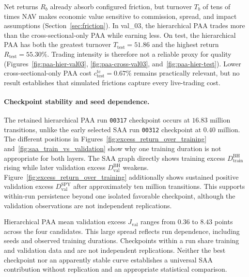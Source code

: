 Net returns \(R_b\) already absorb configured friction, but turnover \(T_b\) of tens of times NAV makes economic value sensitive to commission, spread, and impact assumptions (Section~\ref{sec:friction}). In val\_03, the hierarchical PAA trades more than the cross-sectional-only PAA while earning less. On test, the hierarchical PAA has both the greatest turnover \(T_{\mathrm{test}}=51.86\) and the highest return \(R_{\mathrm{test}}=55.30\%\). Trading intensity is therefore not a reliable proxy for quality (Figures~\ref{fig:paa-hier-val03}, \ref{fig:paa-cross-val03}, and~\ref{fig:paa-hier-test}). Lower cross-sectional-only PAA cost \(c_{\mathrm{test}}^{\mathrm{tc}}=0.67\%\) remains practically relevant, but no result establishes that simulated frictions capture every live-trading cost.

\paragraph{Checkpoint stability and seed dependence.}
The retained hierarchical PAA run \texttt{00317} checkpoint occurs at \(16.83\) million transitions, unlike the early selected SAA run \texttt{00312} checkpoint at \(0.40\) million. The different positions in Figures~\ref{fig:excess_return_over_training} and~\ref{fig:saa_train_vs_validation} show why one training duration is not appropriate for both layers. The SAA graph directly shows training excess \(D_{\mathrm{train}}^{\mathrm{BH}}\) rising while later validation excess \(D_{\mathrm{val}}^{\mathrm{BH}}\) weakens. Figure~\ref{fig:excess_return_over_training} additionally shows sustained positive validation excess \(D_{\mathrm{val}}^{\mathrm{SPY}}\) after approximately ten million transitions. This supports within-run persistence beyond one isolated favorable checkpoint, although the validation observations are not independent replications.

Hierarchical PAA mean validation excess \(J_{\mathrm{val}}\) ranges from \(0.36\) to \(8.43\) points across the four candidates. This large spread reflects run dependence, including seeds and observed training durations. Checkpoints within a run share training and validation data and are not independent replications. Neither the best checkpoint nor an apparently stable curve establishes a universal SAA contribution without replication and an appropriate statistical comparison.

